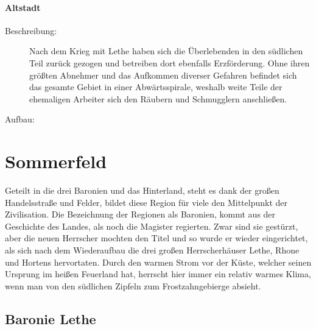 \documentclass[a4paper,12pt,oneside]{book}
\begin{document}
\subsubsection{Altstadt}
\begin{description}
\item[Beschreibung:]Nach dem Krieg mit Lethe haben sich die Überlebenden in den südlichen Teil zurück gezogen und betreiben dort ebenfalls Erzförderung. Ohne ihren größten Abnehmer und das Aufkommen diverser Gefahren befindet sich das gesamte Gebiet in einer Abwärtsspirale, weshalb weite Teile der ehemaligen Arbeiter sich den Räubern und Schmugglern anschließen.
\item[Aufbau:]
\end{description}

\chapter{Sommerfeld}
Geteilt in die drei Baronien und das Hinterland, steht es dank der großen Handelsstraße und Felder, bildet diese Region für viele den Mittelpunkt der Zivilisation. Die Bezeichnung der Regionen als Baronien, kommt aus der Geschichte des Landes, als noch die Magister regierten. Zwar sind sie gestürzt, aber die neuen Herrscher mochten den Titel und so wurde er wieder eingerichtet, als sich nach dem Wiederaufbau die drei großen Herrscherhäuser Lethe, Rhone und Hortens hervortaten. Durch den warmen Strom vor der Küste, welcher seinen Ursprung im heißen Feuerland hat, herrscht hier immer ein relativ warmes Klima, wenn man von den südlichen Zipfeln zum Frostzahngebierge absieht. 

\section{Baronie Lethe}
\end{document}
